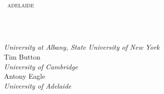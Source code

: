 \thispagestyle{empty}

~\\[4cm]
\begin{center}\forallx\ \textsc{adelaide}\end{center}
\newpage \thispagestyle{empty} ~\\
\newpage \thispagestyle{empty}

\noindent {\HUGE\forallx}




\vfill


\\
\emph{University at Albany, State University of New York}\\[2cm]

{Tim Button}\\
\emph{University of Cambridge}\\[2cm]

{Antony Eagle}\\
\emph{University of Adelaide}



\newpage
\thispagestyle{empty}%

